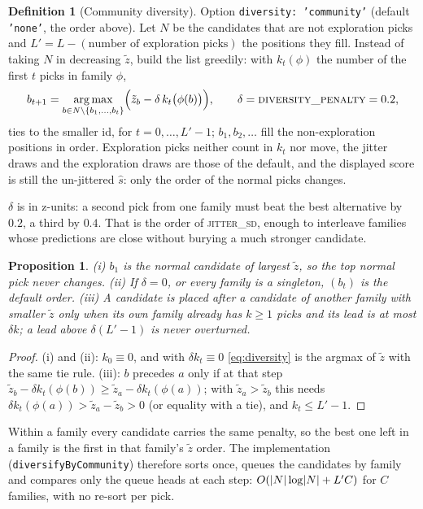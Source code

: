 \documentclass[11pt]{article}
\DeclarePairedDelimiter\abs{\lvert}{\rvert}
\DeclareMathOperator*{\argmax}{arg\,max}
\newcommand{\code}[1]{\texttt{#1}}
\newcommand{\shat}{\hat{s}}
\theoremstyle{plain}
\newtheorem{proposition}[theorem]{Proposition}
\theoremstyle{definition}
\newtheorem{definition}[theorem]{Definition}
\theoremstyle{remark}
\begin{document}
\begin{definition}[Community diversity]\label{def:diversity}
Option \code{diversity: 'community'} (default \code{'none'}, the order above). Let $N$ be the candidates that are not exploration picks and $L' = L - (\text{number of exploration picks})$ the positions they fill. Instead of taking $N$ in decreasing $\tilde z$, build the list greedily: with $k_t(\phi)$ the number of the first $t$ picks in family $\phi$,
\begin{equation}\label{eq:diversity}
b_{t+1} = \argmax_{b \in N \setminus \{b_1, \dots, b_t\}} \Bigl( \tilde z_b - \delta\, k_t\bigl(\phi(b)\bigr) \Bigr), \qquad \delta = \textsc{diversity\_penalty} = 0.2,
\end{equation}
ties to the smaller id, for $t = 0, \dots, L' - 1$; $b_1, b_2, \dots$ fill the non-exploration positions in order. Exploration picks neither count in $k_t$ nor move, the jitter draws and the exploration draws are those of the default, and the displayed score is still the un-jittered $\shat$: only the order of the normal picks changes.
\end{definition}

$\delta$ is in z-units: a second pick from one family must beat the best alternative by $0.2$, a third by $0.4$. That is the order of \textsc{jitter\_sd}, enough to interleave families whose predictions are close without burying a much stronger candidate.

\begin{proposition}\label{prop:diversity}
(i) $b_1$ is the normal candidate of largest $\tilde z$, so the top normal pick never changes. (ii) If $\delta = 0$, or every family is a singleton, $(b_t)$ is the default order. (iii) A candidate is placed after a candidate of another family with smaller $\tilde z$ only when its own family already has $k \ge 1$ picks and its lead is at most $\delta k$; a lead above $\delta (L'-1)$ is never overturned.
\end{proposition}
\begin{proof}
(i) and (ii): $k_0 \equiv 0$, and with $\delta k_t \equiv 0$ \eqref{eq:diversity} is the argmax of $\tilde z$ with the same tie rule. (iii): $b$ precedes $a$ only if at that step $\tilde z_b - \delta k_t(\phi(b)) \ge \tilde z_a - \delta k_t(\phi(a))$; with $\tilde z_a > \tilde z_b$ this needs $\delta k_t(\phi(a)) > \tilde z_a - \tilde z_b > 0$ (or equality with a tie), and $k_t \le L' - 1$.
\end{proof}

Within a family every candidate carries the same penalty, so the best one left in a family is the first in that family's $\tilde z$ order. The implementation (\code{diversifyByCommunity}) therefore sorts once, queues the candidates by family and compares only the queue heads at each step: $O(\abs{N} \log \abs{N} + L' C)$ for $C$ families, with no re-sort per pick.
\end{document}
